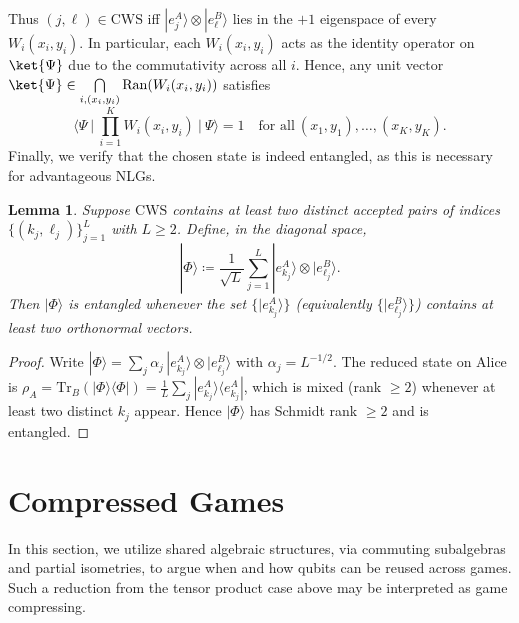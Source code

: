 \documentclass{article}
\newtheorem{lemma}{Lemma}
\begin{document}
    Thus $(j,\ell)\in\mathrm{CWS}$ iff $|e_j^A\rangle\otimes|e_\ell^B\rangle$ lies in the $+1$ eigenspace of every $W_i(x_i,y_i)$. In particular, each $W_i(x_i,y_i)$ acts as the identity operator on $\ket{\Psi}$ due to the commutativity across all $i$. Hence, any unit vector $\ket{\Psi}\in\bigcap\limits_{i,(x_i,y_i)}\mathrm{Ran}(W_i(x_i,y_i))$ satisfies
    \begin{equation}\label{eq: state from CWS}
        \Big\langle \Psi\ \Big|\ \prod_{i=1}^K W_i(x_i,y_i)\ \Big|\ \Psi\Big\rangle = 1 \quad\text{for all}\ (x_1,y_1),\dots,(x_K,y_K).
    \end{equation}
    Finally, we verify that the chosen state is indeed entangled, as this is necessary for advantageous NLGs. 
    
    \begin{lemma}\label{lemma: entangled-CWS}
        Suppose $\mathrm{CWS}$ contains at least two distinct accepted pairs of indices $\{(k_j,\ell_j)\}_{j=1}^{L}$ with $L\ge 2$. Define, in the diagonal space,
        \begin{equation}
            |\Phi\rangle \coloneqq \frac{1}{\sqrt{L}}\sum_{j=1}^{L} |e_{k_j}^A\rangle\otimes|e_{\ell_j}^B\rangle.
        \end{equation}
        Then $|\Phi\rangle$ is entangled whenever the set $\{|e_{k_j}^A\rangle\}$ (equivalently $\{|e_{\ell_j}^B\rangle\}$) contains at least two orthonormal vectors.
    \end{lemma}

    \begin{proof}
        Write $|\Phi\rangle=\sum\limits_j \alpha_j\,|e_{k_j}^A\rangle\otimes|e_{\ell_j}^B\rangle$ with $\alpha_j=L^{-1/2}$. The reduced state on Alice is $\rho_A=\mathrm{Tr}_B(|\Phi\rangle\!\langle\Phi|)=\frac{1}{L}\sum\limits_j |e_{k_j}^A\rangle\!\langle e_{k_j}^A|$, which is mixed (rank $\ge 2$) whenever at least two distinct $k_j$ appear. Hence $|\Phi\rangle$ has Schmidt rank $\ge 2$ and is entangled.
    \end{proof}
    
\section{Compressed Games}\label{sec: dependent}
    In this section, we utilize shared algebraic structures, via commuting subalgebras and partial isometries, to argue when and how qubits can be reused across games. Such a reduction from the tensor product case above may be interpreted as game compressing.
\end{document}
